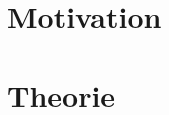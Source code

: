 \section{Motivation}
\begin{quote}
	
	
	
\end{quote} %



\section{Theorie}
\begin{quote}

	
	
	\end{quote}%

